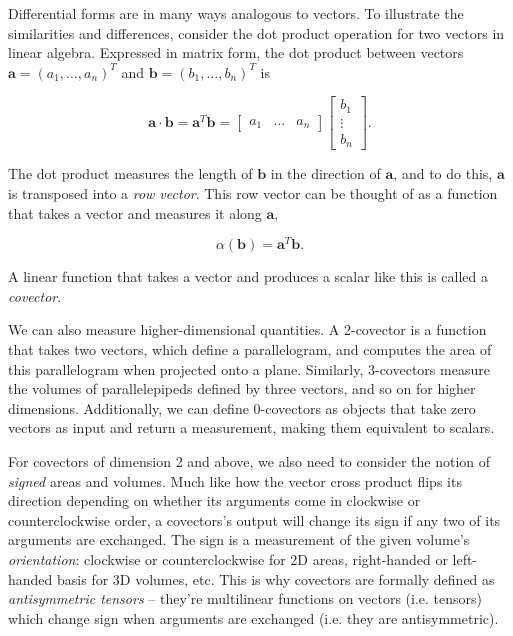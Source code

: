 \documentclass[utf8,english]{gradu3}
\begin{document}
Differential forms are in many ways analogous to vectors.
To illustrate the similarities and differences,
consider the dot product operation
for two vectors in linear algebra.
Expressed in matrix form, the dot product between vectors
$\mathbf{a} = (a_1, \dots, a_n)^T$ and $\mathbf{b} = (b_1, \dots, b_n)^T$
is

\[
  \mathbf{a} \cdot \mathbf{b} = \mathbf{a}^T \mathbf{b}
  = \begin{bmatrix}
    a_1 & \dots & a_n
  \end{bmatrix}
  \begin{bmatrix}
    b_1 \\ \vdots \\ b_n
  \end{bmatrix}.
\]

The dot product measures the length of $\mathbf{b}$ in the direction of $\mathbf{a}$,
and to do this, $\mathbf{a}$ is transposed into a \textit{row vector}.
This row vector can be thought of as a function
that takes a vector and measures it along $\mathbf{a}$,

\[
  \alpha(\mathbf{b}) = \mathbf{a}^T \mathbf{b}.
\]

A linear function that takes a vector and produces a scalar like this
is called a \textit{covector}.

We can also measure higher-dimensional quantities.
A 2-covector is a function that takes two vectors,
which define a parallelogram,
and computes the area of this parallelogram
when projected onto a plane.
Similarly, 3-covectors measure the volumes of parallelepipeds
defined by three vectors, and so on for higher dimensions.
Additionally, we can define 0-covectors
as objects that take zero vectors as input and return a measurement,
making them equivalent to scalars.

For covectors of dimension 2 and above, we also need to consider
the notion of \textit{signed} areas and volumes.
Much like how the vector cross product flips its direction
depending on whether its arguments come in clockwise or counterclockwise order,
a covectors's output will change its sign
if any two of its arguments are exchanged.
The sign is a measurement of the given volume's \textit{orientation}:
clockwise or counterclockwise for 2D areas,
right-handed or left-handed basis for 3D volumes, etc.
This is why covectors are formally defined as \textit{antisymmetric tensors}
-- they're multilinear functions on vectors (i.e. tensors)
which change sign when arguments are exchanged (i.e. they are antisymmetric).
\end{document}

